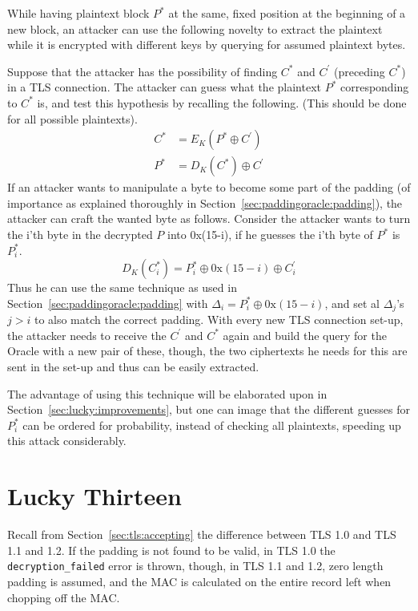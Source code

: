 \documentclass[10pt,conference,a4paper]{IEEEtran}
\begin{document}
While having plaintext block $P^{*}$ at the same, fixed position at the beginning of a new block, an attacker can use the following novelty to extract the plaintext while it is encrypted with different keys by querying for assumed plaintext bytes. 

Suppose that the attacker has the possibility of finding $C^{*}$ and $C^{'}$ (preceding $C^{*}$) in a TLS connection. The attacker can guess what the plaintext $P^{*}$ corresponding to $C^{*}$ is, and test this hypothesis by recalling the following. (This should be done for all possible plaintexts).
\[
\begin{split}
C^{*} &= E_K(P^{*} \oplus C^{'}) \\
P^{*} &= D_K(C^{*}) \oplus C^{'}
\end{split}
\]
If an attacker wants to manipulate a byte to become some part of the padding (of importance as explained thoroughly in Section~\ref{sec:paddingoracle:padding}), the attacker can craft the wanted byte as follows. Consider the attacker wants to turn the i'th byte in the decrypted $P$ into 0x(15-i), if he guesses the i'th byte of $P^{*}$ is $P_i^{*}$.
\[ D_K(C_i^{*}) = P_i^{*} \oplus 0\text{x}(15-i) \oplus C_i^{'} \]
Thus he can use the same technique as used in Section~\ref{sec:paddingoracle:padding} with $\Delta_i = P_i^{*} \oplus 0\text{x}(15-i)$, and set al $\Delta_j$'s $j>i$ to also match the correct padding. With every new TLS connection set-up, the attacker needs to receive the $C^{'}$ and $C^{*}$ again and build the query for the Oracle with a new pair of these, though, the two ciphertexts he needs for this are sent in the set-up and thus can be easily extracted.

The advantage of using this technique will be elaborated upon in Section~\ref{sec:lucky:improvements}, but one can image that the different guesses for $P_i^{*}$ can be ordered for probability, instead of checking all plaintexts, speeding up this attack considerably.



\section{Lucky Thirteen}
\label{sec:lucky}
Recall from Section~\ref{sec:tls:accepting} the difference between TLS 1.0 and TLS 1.1 and 1.2. If the padding is not found to be valid, in TLS 1.0 the \texttt{decryption\_failed} error is thrown, though, in TLS 1.1 and 1.2, zero length padding is assumed, and the MAC is calculated on the entire record left when chopping off the MAC.
\end{document}
